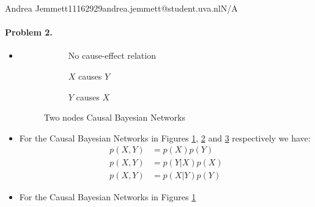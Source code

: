 \documentclass{amsmlaj}
\begin{document}
{Andrea Jemmett}{11162929}{andrea.jemmett@student.uva.nl}{N/A}


\paragraph{Problem 2.}
\begin{sol}
	\begin{itemize}
		\item[(a)] \hfill \vspace{-1cm}
			\begin{figure}[h]
				\centering
				\begin{subfigure}[b]{.3\textwidth}
					\centering
					\caption{No cause-effect relation}
					\label{fig:cbn1}
				\end{subfigure}
				\begin{subfigure}[b]{.3\textwidth}
					\centering
					\caption{$X$ causes $Y$}
					\label{fig:cbn2}
				\end{subfigure}
				\begin{subfigure}[b]{.3\textwidth}
					\centering
					\caption{$Y$ causes $X$}
					\label{fig:cbn3}
				\end{subfigure}
				\caption{Two nodes Causal Bayesian Networks}
				\label{fig:cbn}
			\end{figure}
		\item[(b)] For the Causal Bayesian Networks in Figures \ref{fig:cbn1},
			\ref{fig:cbn2} and \ref{fig:cbn3} respectively we have:
			\begin{align}
				p(X,Y) &= p(X)p(Y) \\
				p(X,Y) &= p(Y|X)p(X) \\
				p(X,Y) &= p(X|Y)p(Y)
			\end{align}
		\item[(c)] For the Causal Bayesian Networks in Figures \ref{fig:cbn1}

\end{itemize}
\end{sol}
\end{document}
